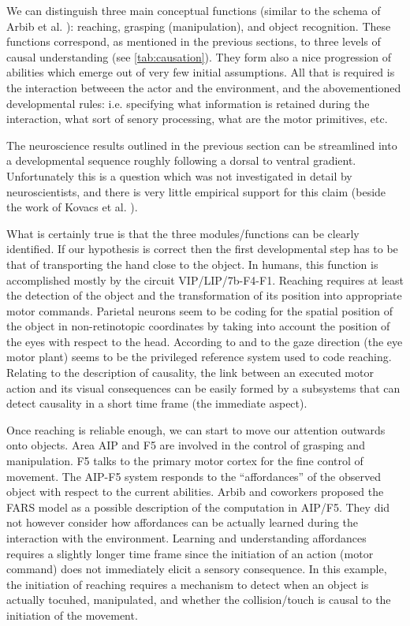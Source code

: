We can distinguish three main conceptual functions (similar to the 
schema of Arbib et al. \cite{arbib-1981}): reaching, grasping (manipulation), and
object recognition. These functions correspond, as mentioned in the 
previous sections, to three levels of causal understanding (see \ref{tab:causation}).
They form also a nice progression of abilities which emerge out
of very few initial assumptions. All that is required is the 
interaction betweeen the actor and the environment, and the abovementioned
developmental rules: i.e. specifying what information is retained during the
interaction, what sort of senory processing, what are the motor
primitives, etc. 

The neuroscience results outlined in the previous section can be streamlined
into a developmental sequence roughly following a dorsal to ventral
gradient. Unfortunately this is a question which was not investigated in detail
by neuroscientists, and there is very little empirical support for this claim
(beside the work of Kovacs et al. \cite{kovacs00human}).

What is certainly true is that the three modules/functions can be 
clearly identified. If our hypothesis is correct then 
the first developmental step has to be that of transporting the hand 
close to the object. In humans, this function is accomplished mostly by the
circuit VIP/LIP/7b-F4-F1. Reaching requires at least the detection of
the object and the transformation of its position into appropriate 
motor commands. Parietal neurons seem to be coding for the spatial
position of the object in non-retinotopic coordinates by taking
into account the position of the eyes with respect to the head. 
According to \cite{pouget-ducom-torri-bavelier-2002} and 
to \cite{flanders-daghestani-berthoz-1999} the 
gaze direction (the eye motor plant) seems to be the privileged
reference system used to code reaching. 
Relating to the description of causality, the link between an executed
motor action and its visual consequences can be easily formed by 
a subsystems that can detect causality in a short time frame (the immediate
aspect).


Once reaching is reliable enough, we can start to move our attention 
outwards onto objects. Area AIP and F5 are involved in the
control of grasping and manipulation. F5 talks to the 
primary motor cortex for the fine control of movement. 
The AIP-F5 system responds to the ``affordances'' of the observed 
object with respect to the
current abilities.
Arbib and coworkers \cite{fagg-arbib-1998} proposed 
the FARS model as a possible description of the computation in AIP/F5. 
They did not however consider how affordances can be 
actually learned during the interaction with the environment. 
Learning and understanding affordances requires a slightly longer 
time frame since the initiation of an action (motor command) does not
immediately elicit a sensory consequence. In this example, the initiation
of reaching requires a mechanism to detect when an object is actually 
tocuhed, manipulated, and whether the collision/touch is causal to the
initiation of the movement.

